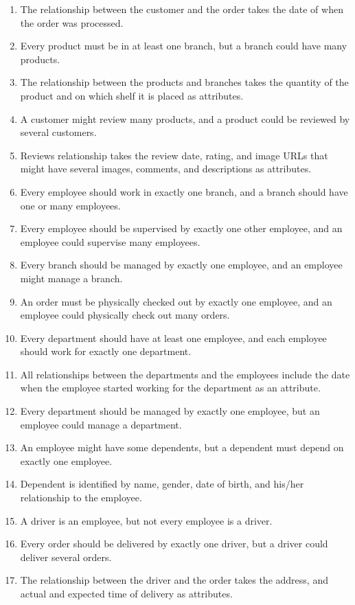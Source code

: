 \documentclass[11pt]{article}
\begin{document}
\begin{enumerate}
  \item The relationship between the customer and the order takes the date of when the order was processed.
  \item Every product must be in at least one branch, but a branch could have many products.
  \item The relationship between the products and branches takes the quantity of the product and on which shelf it is placed as attributes.
  \item A customer might review many products, and a product could be reviewed by several customers.
  \item Reviews relationship takes the review date, rating, and image URLs that might have several images, comments, and descriptions as attributes.
  \item Every employee should work in exactly one branch, and a branch should have one or many employees.
  \item Every employee should be supervised by exactly one other employee, and an employee could supervise many employees.
  \item Every branch should be managed by exactly one employee, and an employee might manage a branch.
  \item An order must be physically checked out by exactly one employee, and an employee could physically check out many orders.
  \item Every department should have at least one employee, and each employee should work for exactly one department.
  \item All relationships between the departments and the employees include the date when the employee started working for the department as an attribute.
  \item Every department should be managed by exactly one employee, but an employee could manage a department.
  \item An employee might have some dependents, but a dependent must depend on exactly one employee.
  \item Dependent is identified by name, gender, date of birth, and his/her relationship to the employee.
  \item A driver is an employee, but not every employee is a driver.
  \item Every order should be delivered by exactly one driver, but a driver could deliver several orders.
  \item The relationship between the driver and the order takes the address, and actual and expected time of delivery as attributes.

\end{enumerate}
\end{document}
